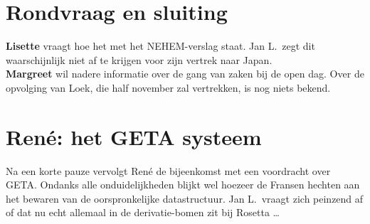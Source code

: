 \section{Rondvraag en sluiting}
{\bf Lisette} vraagt hoe het met het NEHEM-verslag staat. Jan L.\ zegt dit 
waarschijnlijk niet af te krijgen voor zijn vertrek naar Japan.\\
{\bf Margreet} wil nadere informatie over de gang van zaken bij de open dag.
Over de opvolging van Loek, die half november zal vertrekken, is nog niets 
bekend.

\section{Ren\'{e}: het GETA systeem}
Na een korte pauze vervolgt Ren\'{e} de bijeenkomst met een voordracht over 
GETA. Ondanks alle onduidelijkheden blijkt wel hoezeer de Fransen hechten aan 
het bewaren van de oorspronkelijke datastructuur. Jan L.\ vraagt zich peinzend 
af of dat nu echt allemaal in de derivatie-bomen zit bij Rosetta \ldots


